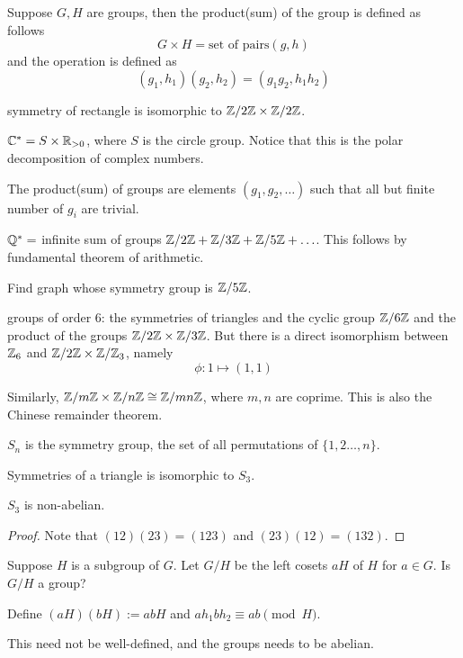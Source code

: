 \begin{definition}
	Suppose $G,H$ are groups, then the product(sum) of the group is defined as follows
	\[ G \times H = \text{set of pairs} (g,h) \]
	and the operation is defined as 
	\[ (g_1,h_1)(g_2,h_2) = (g_1g_2,h_1h_2)\]
\end{definition}
\begin{example}
	symmetry of rectangle is isomorphic to $\mathbb Z/2 \mathbb Z \times \mathbb Z/2 \mathbb Z$.
\end{example}
\begin{example}
	$\mathbb C^* = S \times \mathbb R_{>0}$, where $S$ is the circle group. Notice that this is the polar decomposition of complex numbers.
\end{example}
\begin{definition}
	The product(sum) of groups are elements $(g_1, g_2, \ldots)$ such that all but finite number of $g_i$ are trivial.
\end{definition}
\begin{example}
	$\mathbb Q^* = $ infinite sum of groups $\mathbb Z/2 \mathbb Z + \mathbb Z /3 \mathbb Z + \mathbb Z /5 \mathbb Z + \ldots$. This follows by fundamental theorem of arithmetic.
\end{example}
\begin{exercise}
	Find graph whose symmetry group is $\mathbb Z/5 \mathbb Z$.
\end{exercise}
\begin{example}
	groups of order $6$: the symmetries of triangles and the cyclic group $\mathbb Z/6\mathbb Z$ and the product of the groups $\mathbb Z/2 \mathbb Z \times \mathbb Z/3\mathbb Z$. But there is a direct isomorphism between $\mathbb Z_6$ and $\mathbb Z/2 \mathbb Z \times \mathbb Z/\mathbb Z_3$, namely 
	\[ \phi: 1 \mapsto (1,1)\]
\end{example}
\begin{remark}
	Similarly, $\mathbb Z/m \mathbb Z \times \mathbb Z/n \mathbb Z \cong \mathbb Z/ mn \mathbb Z$, where $m,n$ are coprime. This is also the Chinese remainder theorem.
\end{remark}
\begin{definition}
	$S_n$ is the symmetry group, the set of all permutations of $\{1,2 \ldots, n\}$.
\end{definition}
\begin{example}
	Symmetries of a triangle is isomorphic to $S_3$.
\end{example}
\begin{proposition}
	$S_3$ is non-abelian.
\end{proposition}
\begin{proof}
	Note that $(12)(23) = (123)$ and $(23)(12) = (132)$.
\end{proof}
\begin{question}
	Suppose $H$ is a subgroup of $G$. Let $G/H$ be the left cosets $aH$ of $H$ for $a \in G$. Is $G/H$ a group?
\end{question}
\begin{answer}
	Define $(aH)(bH) := abH$ and $ah_1bh_2 \equiv ab \pmod H$.
\end{answer}
\begin{problem}
	This need not be well-defined, and the groups needs to be abelian.
\end{problem}

